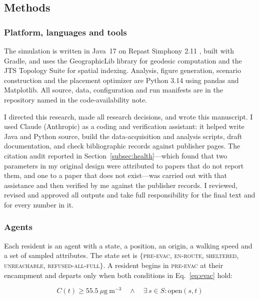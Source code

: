 \documentclass[graybox]{svmult}
\begin{document}
\subsection{Methods}
\label{subsec:methods}

\subsubsection{Platform, languages and tools}

The simulation is written in Java~17 on Repast Simphony 2.11 \cite{north2013},
built with Gradle, and uses the GeographicLib library for geodesic computation
and the JTS Topology Suite for spatial indexing. Analysis, figure generation,
scenario construction and the placement optimizer are Python 3.14 using pandas
and Matplotlib. All source, data, configuration and run manifests are in the
repository named in the code-availability note.

 I directed this research, made all research decisions,
and wrote this manuscript. I used Claude (Anthropic) as a coding and
verification assistant: it helped write Java and Python source, build the
data-acquisition and analysis scripts, draft documentation, and check
bibliographic records against publisher pages. The citation audit reported in
Section~\ref{subsec:health}---which found that two parameters in my original
design were attributed to papers that do not report them, and one to a paper
that does not exist---was carried out with that assistance and then verified by
me against the publisher records. I reviewed, revised and approved all outputs
and take full responsibility for the final text and for every number in it.

\subsubsection{Agents}

Each resident is an agent with a state, a position, an origin, a walking speed
and a set of sampled attributes. The state set is $\{$\textsc{pre-evac},
\textsc{en-route}, \textsc{sheltered}, \textsc{unreachable},
\textsc{refused-all-full}$\}$. A resident begins in \textsc{pre-evac} at their
encampment and departs only when both conditions in Eq.~\ref{eq:evac} hold:

\begin{equation}
\label{eq:evac}
C(t) \geq 55.5\ \mu\mathrm{g\ m}^{-3}
\quad\wedge\quad
\exists\, s \in S : \mathrm{open}(s, t)
\end{equation}
\end{document}
